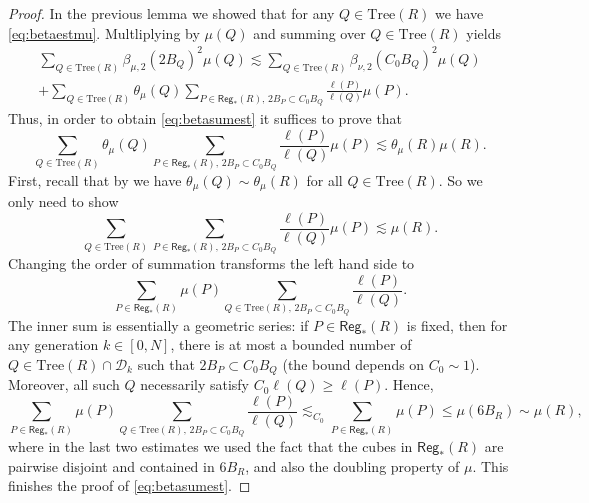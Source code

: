 \documentclass[11pt,reqno]{amsart}
\newcommand{\Tr}{\mathrm{Tree}}
\newcommand{\fr}[2]{\frac{#1}{#2}}
\theoremstyle{definition}
\theoremstyle{remark}
\numberwithin{equation}{section}
\newcommand{\DD}{\mathcal{D}}
\newcommand{\Reg}{\mathsf{Reg}_*}
\theoremstyle{theorem}
\theoremstyle{definition}
\theoremstyle{remark}
\numberwithin{equation}{section}
\begin{document}
	\begin{proof}
		In the previous lemma we showed that for any $Q\in\Tr(R)$ we have \eqref{eq:betaestmu}. Multliplying by $\mu(Q)$ and summing over $Q\in\Tr(R)$ yields
		\begin{multline*}
			\sum_{Q\in\Tr(R)}\beta_{\mu,2}(2B_Q)^2\mu(Q)\lesssim \sum_{Q\in\Tr(R)}\beta_{\nu,2}(C_0B_Q)^2\mu(Q)\\
			 + \sum_{Q\in\Tr(R)}\theta_\mu(Q)\sum_{P\in\Reg(R),\, 2B_P\subset C_0B_Q} \fr{\ell(P)}{\ell(Q)}\mu(P).
		\end{multline*}
		Thus, in order to obtain \eqref{eq:betasumest} it suffices to prove that
		\begin{equation*}
			\sum_{Q\in\Tr(R)}\theta_\mu(Q)\sum_{P\in\Reg(R),\, 2B_P\subset C_0B_Q} \fr{\ell(P)}{\ell(Q)}\mu(P)\lesssim \theta_\mu(R)\mu(R).
		\end{equation*}
	First, recall that by  we have $\theta_\mu(Q)\sim\theta_\mu(R)$ for all $Q\in\Tr(R)$. So we only need to show
	\begin{equation}\label{eq:goal1}
		\sum_{Q\in\Tr(R)}\sum_{P\in\Reg(R),\, 2B_P\subset C_0B_Q} \fr{\ell(P)}{\ell(Q)}\mu(P)\lesssim \mu(R).
	\end{equation}
	Changing the order of summation transforms the left hand side to
	\begin{equation*}
		\sum_{P\in\Reg(R)}\mu(P)\sum_{Q\in\Tr(R),\, 2B_P\subset C_0B_Q} \fr{\ell(P)}{\ell(Q)}.
	\end{equation*}
	The inner sum is essentially a geometric series: if $P\in\Reg(R)$ is fixed, then for any generation $k\in [0, N]$, there is at most a bounded number of $Q\in\Tr(R)\cap\DD_k$ such that $2B_P\subset C_0B_Q$ (the bound depends on $C_0\sim 1$). Moreover, all such $Q$ necessarily satisfy $C_0\ell(Q)\ge \ell(P)$. Hence,
	\begin{equation*}
		\sum_{P\in\Reg(R)}\mu(P)\sum_{Q\in\Tr(R),\, 2B_P\subset C_0B_Q} \fr{\ell(P)}{\ell(Q)}\lesssim_{C_0}\sum_{P\in\Reg(R)}\mu(P)\le \mu(6B_R)\sim \mu(R),
	\end{equation*}
	where in the last two estimates we used the fact that the cubes in $\Reg(R)$ are pairwise disjoint and contained in $6B_R$, and also the doubling property of $\mu$. This finishes the proof of \eqref{eq:betasumest}.
	\end{proof}
\end{document}
